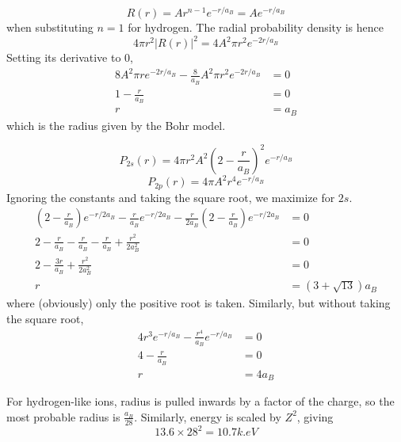 \documentclass[answers]{exam}
\begin{document}
\begin{questions}

\begin{solution}
	$$R(r) = Ar^{n-1}e^{-r/a_B} = Ae^{-r/a_B}$$
	when substituting $n=1$ for hydrogen. The radial probability density is hence
	$$4\pi r^2|R(r)|^2 = 4A^2\pi r^2e^{-2r/a_B}$$
	Setting its derivative to 0,
	\begin{align*}
		8A^2\pi re^{-2r/a_B} - \frac{8}{a_B}A^2\pi r^2e^{-2r/a_B} &= 0 \\
		1 - \frac{r}{a_B} &= 0 \\
		r &= a_B
	\end{align*}
	which is the radius given by the Bohr model.
\end{solution}


\begin{solution}
	$$P_{2s}(r) = 4\pi r^2 A^2\left(2-\frac{r}{a_B}\right)^2 e^{-r/a_B}$$
	$$P_{2p}(r) = 4\pi A^2r^4e^{-r/a_B}$$
	Ignoring the constants and taking the square root, we maximize for $2s$.
	\begin{align*}
		\left(2-\frac{r}{a_B}\right)e^{-r/2a_B} - \frac{r}{a_B} e^{-r/2a_B} - \frac{r}{2a_B}\left(2-\frac{r}{a_B}\right) e^{-r/2a_B} &= 0 \\
		2-\frac{r}{a_B} - \frac{r}{a_B} - \frac{r}{a_B} + \frac{r^2}{2a^2_B} &= 0 \\
		2 - \frac{3r}{a_B} + \frac{r^2}{2a^2_B} &= 0 \\
		r &= (3+\sqrt{13})a_B
	\end{align*}
	where (obviously) only the positive root is taken. Similarly, but without taking the square root,
	\begin{align*}
		4r^3e^{-r/a_B} - \frac{r^4}{a_B}e^{-r/a_B} &= 0 \\
		4 - \frac{r}{a_B} &= 0 \\
		r &= 4a_B
	\end{align*}
\end{solution}


\begin{solution}
	For hydrogen-like ions, radius is pulled inwards by a factor of the charge, so the most probable radius is $\frac{a_B}{28}$. Similarly, energy is scaled by $Z^2$, giving
	$$13.6 \times 28^2 = 10.7\unit{k.eV}$$
\end{solution}
\end{questions}
\end{document}
